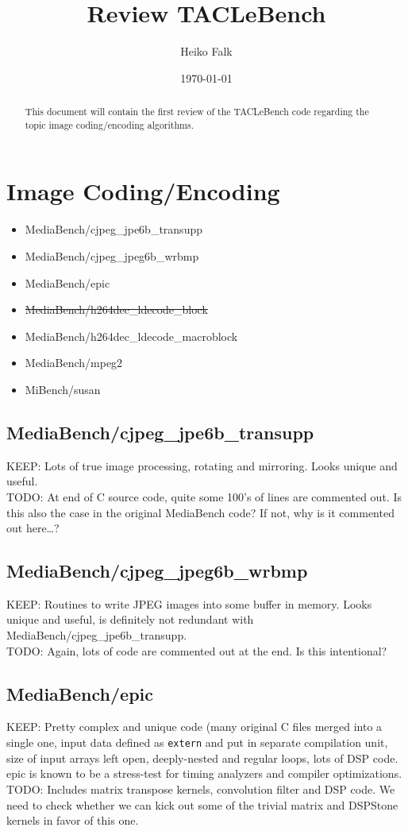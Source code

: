 \documentclass[a4paper]{article}
\title{Review TACLeBench}
\author{Heiko Falk}
\date{\today}
\begin{document}
\maketitle

\begin{abstract}
This document will contain the first review of the TACLeBench code regarding the
topic image coding/encoding algorithms.
\end{abstract}


\section{Image Coding/Encoding}

\begin{itemize}
        \item MediaBench/cjpeg\_jpe6b\_transupp
        \item MediaBench/cjpeg\_jpeg6b\_wrbmp
        \item MediaBench/epic
        \item \st{MediaBench/h264dec\_ldecode\_block}
        \item MediaBench/h264dec\_ldecode\_macroblock
        \item MediaBench/mpeg2
        \item MiBench/susan
\end{itemize}


\subsection{MediaBench/cjpeg\_jpe6b\_transupp}
  KEEP: Lots of true image processing, rotating and mirroring. Looks unique and useful. \\
  TODO: At end of C source code, quite some 100's of lines are commented out. Is this also the case in the original MediaBench code? If not, why is it commented out here\dots?
\subsection{MediaBench/cjpeg\_jpeg6b\_wrbmp}
  KEEP: Routines to write JPEG images into some buffer in memory. Looks unique and useful, is definitely not redundant with MediaBench/cjpeg\_jpe6b\_transupp. \\
  TODO: Again, lots of code are commented out at the end. Is this intentional?
\subsection{MediaBench/epic}
  KEEP: Pretty complex and unique code (many original C files merged into a single one, input data defined as {\tt extern} and put in separate compilation unit, size of input arrays left open, deeply-nested and regular loops, lots of DSP code. epic is known to be a stress-test for timing analyzers and compiler optimizations. \\
  TODO: Includes matrix transpose kernels, convolution filter and DSP code. We need to check whether we can kick out some of the trivial matrix and DSPStone kernels in favor of this one.
\end{document}
